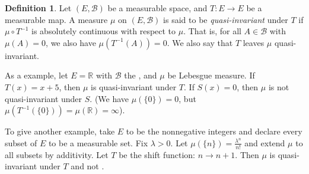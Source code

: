 \documentclass[12pt]{article}
\theoremstyle{definition}
\newtheorem{definition}{Definition}
\begin{document}
\begin{definition}
Let $(E, \mathcal{B})$ be a measurable space, and $T : E \to E$ be a measurable map.  A measure $\mu$ on $(E, \mathcal{B})$ is said to be \emph{quasi-invariant} under $T$ if $\mu \circ T^{-1}$ is absolutely continuous with respect to  $\mu$.  That is, for all $A \in \mathcal{B}$ with $\mu(A)=0$, we also have $\mu(T^{-1}(A)) = 0$.  We also say that $T$ leaves $\mu$ quasi-invariant.
\end{definition}

As a  example, let $E = \mathbb{R}$ with $\mathcal{B}$ the  , and $\mu$ be Lebesgue measure.  If $T(x) = x + 5$, then $\mu$ is quasi-invariant under $T$.  If $S(x)=0$, then $\mu$ is not quasi-invariant under $S$.  (We have $\mu(\{0\}) = 0$, but $\mu(T^{-1}(\{0\})) = \mu(\mathbb{R}) = \infty$).

To give another example, take $E$ to be the nonnegative integers and
declare  every subset of $E$ to be  a measurable set. Fix $\lambda > 0$.
Let $\mu(\{n\}) = \frac{\lambda^n}{n!}$ and extend $\mu$ to all subsets
by additivity.  Let $T$ be the shift function: $n \to n+1$. Then
$\mu$ is quasi-invariant under $T$ and not .
\end{document}
